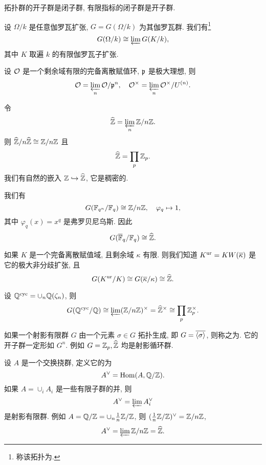 \begin{exercise}\label{exe:closed_open_subgroups}
拓扑群的开子群是闭子群, 有限指标的闭子群是开子群.
\end{exercise}

\begin{example}
设 $\Omega/k$ 是任意伽罗瓦扩张, $G=G(\Omega/k)$ 为其伽罗瓦群. 我们有\footnote{称该拓扑为.}
  \[G(\Omega/k)\cong\varprojlim\limits G(K/k),\]
其中 $K$ 取遍 $k$ 的有限伽罗瓦子扩张.
\end{example}

\begin{example}
设 ${\mathcal{O}}$ 是一个剩余域有限的完备离散赋值环, ${\mathfrak{p}}$ 是极大理想, 则
  \[{\mathcal{O}}=\varprojlim\limits_n {\mathcal{O}}/{\mathfrak{p}}^n,\quad {\mathcal{O}}^\times=\varprojlim\limits_n {\mathcal{O}}^\times/U^{(n)}.\]
\end{example}

\begin{example}
令
  \[\widehat {{\mathbb{Z}}}=\varprojlim\limits_n {\mathbb{Z}}/n{\mathbb{Z}}.\]
则 $\widehat {{\mathbb{Z}}}/n\widehat {{\mathbb{Z}}}\cong {\mathbb{Z}}/n{\mathbb{Z}}$ 且
  \[\widehat {{\mathbb{Z}}}=\prod_p {\mathbb{Z}}_p.\]
我们有自然的嵌入 ${\mathbb{Z}}\hookrightarrow \widehat {{\mathbb{Z}}}$, 它是稠密的.
\end{example}

\begin{example}
我们有 
  \[G({\mathbb{F}}_{q^n}/{\mathbb{F}}_q)\cong {\mathbb{Z}}/n{\mathbb{Z}},\quad \varphi_q\mapsto 1,\]
其中 $\varphi_q(x)=x^q$ 是弗罗贝尼乌斯. 因此
  \[G(\overline{{\mathbb{F}}}_q/{\mathbb{F}}_q)\cong \widehat {{\mathbb{Z}}}.\]
\end{example}

\begin{example}
如果 $K$ 是一个完备离散赋值域, 且剩余域 $\kappa$ 有限. 则我们知道 $K^{\mathrm{ur}}=K W(\overline\kappa)$ 是它的极大非分歧扩张, 且
  \[G(K^{\mathrm{ur}}/K)\cong G(\overline \kappa/\kappa)\cong \widehat {{\mathbb{Z}}}.\]
\end{example}

\begin{example}
设 ${\mathbb{Q}}^{\mathrm{cyc}}=\cup_n {\mathbb{Q}}(\zeta_n)$, 则
  \[G({\mathbb{Q}}^{\mathrm{cyc}}/{\mathbb{Q}})\cong \varprojlim\limits ({\mathbb{Z}}/n{\mathbb{Z}})^\times=\widehat{{\mathbb{Z}}}^\times\cong\prod_p {\mathbb{Z}}_p^\times.\]
\end{example}

\begin{example}
如果一个射影有限群 $G$ 由一个元素 $\sigma\in G$ 拓扑生成, 即 $G=\overline{\langle{\sigma}\rangle}$, 则称之为. 它的开子群一定形如 $G^n$. 例如 $G={\mathbb{Z}}_p,\widehat {{\mathbb{Z}}}$ 均是射影循环群.
\end{example}

\begin{example}
设 $A$ 是一个交换挠群, 定义它的为
  \[A^\vee={\mathrm{Hom}}(A,{\mathbb{Q}}/{\mathbb{Z}}).\]
如果 $A=\cup_i A_i$ 是一些有限子群的并, 则
  \[A^\vee=\varprojlim\limits A_i^\vee\]
是射影有限群. 例如 $A={\mathbb{Q}}/{\mathbb{Z}}=\cup_n \frac{1}{n}{\mathbb{Z}}/{\mathbb{Z}}$,
则 $(\frac{1}{n}{\mathbb{Z}}/{\mathbb{Z}})^\vee={\mathbb{Z}}/n{\mathbb{Z}}$,
  \[A^\vee=\varprojlim\limits {\mathbb{Z}}/n{\mathbb{Z}}=\widehat {{\mathbb{Z}}}.\]
\end{example}

